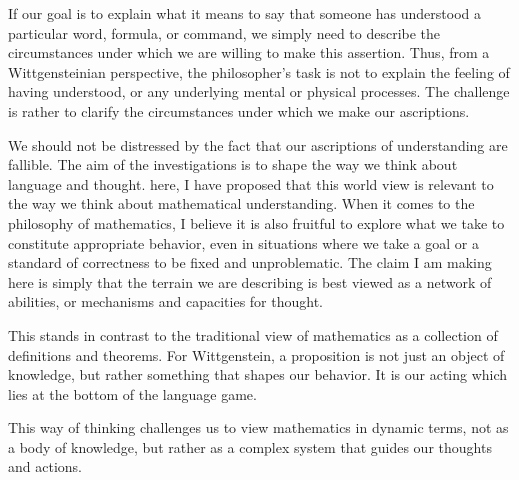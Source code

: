 \documentclass{article}
\begin{document}
If our goal is to explain what it means to say that someone has understood a
particular word, formula, or command, we simply need to describe the 
circumstances under which we are willing to make this assertion. Thus, from a
Wittgensteinian perspective, the philosopher's task is not to explain the
feeling of having understood, or any underlying mental or physical processes.
The challenge is rather to clarify the circumstances under which we make our
ascriptions.

We should not be distressed by the fact that our ascriptions of understanding
are fallible. The aim of the investigations is to shape the way we think about
language and thought. here, I have proposed that this world view is relevant to
the way we think about mathematical understanding. When it comes to the
philosophy of mathematics, I believe it is also fruitful to explore what we take
to constitute appropriate behavior, even in situations where we take a goal or
a standard of correctness to be fixed and unproblematic. The claim I am making
here is simply that the terrain we are describing is best viewed as a network
of abilities, or mechanisms and capacities for thought.

This stands in contrast to the traditional view of mathematics as a collection
of definitions and theorems. For Wittgenstein, a proposition is not just an
object of knowledge, but rather something that shapes our behavior. It is our
acting which lies at the bottom of the language game.

This way of thinking challenges us to view mathematics in dynamic terms, not as
a body of knowledge, but rather as a complex system that guides our thoughts
and actions.
\end{document}
